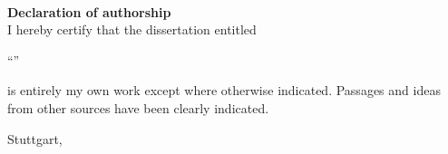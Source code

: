 \documentclass[
     paper=a4
    ,fontsize=13pt
    ,DIV=12
    ,pagesize
]{scrartcl}
\begin{document}
\thispagestyle{empty}

~ \vspace{12cm}

\textbf{\Large Declaration of authorship}\\

I hereby certify that the dissertation entitled

\begin{center}
{\large ``\thesisTitle''}
\end{center}

is entirely my own work except where otherwise indicated. Passages and ideas from other sources have been clearly indicated.
\vspace{3cm}

Stuttgart, \thesisDate \hfill \thesisAuthor
\end{document}
